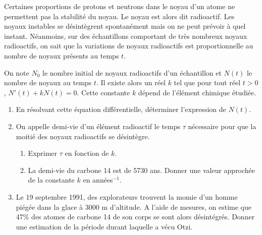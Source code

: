 \documentclass[11pt,fleqn, openany]{book} %
\begin{document}
\begin{exercise}[topic=diff03, subtitle={(Datation au carbone 14)}] Certaines proportions de protons et neutrons dans le noyau d'un atome ne permettent pas la stabilité du noyau. Le noyau est alors dit radioactif. Les noyaux instables se désintègrent spontanément mais on ne peut prévoir à quel instant. Néanmoins, sur des échantillons comportant de très nombreux noyaux radioactifs, on sait que la variations de noyaux radioactifs est proportionnelle au nombre de noyaux présents au temps $t$. 

On note $N_0$ le nombre initial de noyaux radioactifs d'un échantillon et $N(t)$ le nombre de noyaux au temps $t$. Il existe alors un réel $k$ tel que pour tout réel $t>0$, $N'(t)+kN(t)=0$. Cette constante $k$ dépend de l'élément chimique étudiée.

\begin{enumerate}
\item En résolvant cette équation différentielle, déterminer l'expression de $N(t)$.
\item On appelle demi-vie d'un élément radioactif le temps $\tau$ nécessaire pour que la moitié des noyaux radioactifs se désintègre.
\begin{enumerate}
\item Exprimer $\tau$ en fonction de $k$.
\item La demi-vie du carbone 14 est de 5730 ans. Donner une valeur approchée de la constante $k$ en années$^{-1}$.
\end{enumerate}
\item Le 19 septembre 1991, des explorateurs trouvent la momie d'un homme piégée dans la glace à 3000 m d'altitude. A l'aide de mesures, on estime que 47\% des atomes de carbone 14 de son corps se sont alors désintégrés. Donner une estimation de la période durant laquelle a vécu Otzi.
\end{enumerate}\end{exercise}
\end{document}
